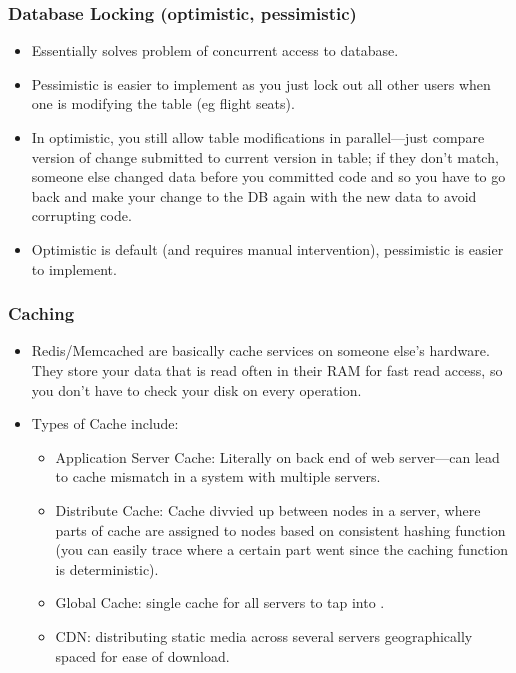 \begin{frame}
	\frametitle{Database Locking (optimistic, pessimistic)}
		
			\begin{itemize}
				\item Essentially solves problem of concurrent access to database. 
				\item Pessimistic is easier to implement as 
you just lock out all other users when one is modifying the table (eg flight seats). 
				\item In optimistic, you 
still allow table modifications in parallel—just compare version of change submitted to current version in table; if they don’t match, someone else changed data before you committed code and 
so you have to go back and make your change to the DB again with the new data to avoid 
corrupting code. 
				\item Optimistic is default (and requires manual intervention), pessimistic is easier to 
implement. 
			\end{itemize}		
\end{frame}

\begin{frame}
	\frametitle{Caching}
		
			\begin{itemize}
				\item Redis/Memcached are basically cache services on someone else’s hardware. They store your data 
that is read often in their RAM for fast read access, so you don’t have to check your disk on every 
operation. 
				\item Types of Cache include:
			\begin{itemize}
				\item Application Server Cache: Literally on back end of web server—can lead to cache mismatch in a system with multiple servers. 
				\item Distribute Cache: Cache divvied up between nodes in a server, where parts of cache are assigned to 
nodes based on consistent hashing function (you can easily trace where a certain part went since 
the caching function is deterministic).
				\item Global Cache: single cache for all servers to tap into . 
				\item CDN: distributing static media across several servers geographically spaced for ease of 
download. 
			\end{itemize}		

			\end{itemize}		
\end{frame}


